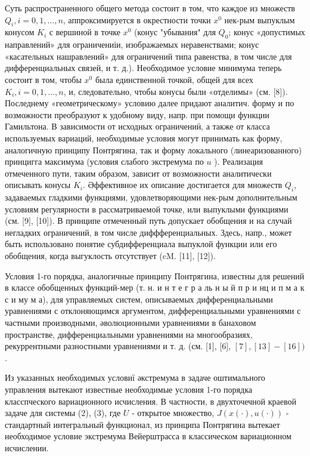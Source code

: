 \documentclass[10pt]{article}
\begin{document}
Суть распространенного общего метода состоит в том, что каждое из множеств $Q_{i}, i=0,1, \ldots, n$, аппроксимируется в окрестности точки $x^{0}$ нек-рым выпуклым конусом $K_{i}$ с вершиной в точке $x^{0}$ (конус "убывания" для $Q_{0}$; конус «допустимых направлений» для ограничениіи, изображаемых неравенствами; конус «касательных нашравлений» для ограничений типа равенства, в том числе для дифференциальных связей, и т. д.). Необходимое условие минимума теперь состоит в том, чтобы $x^{0}$ была единственной точкой, общей для всех $K_{i}, i=0,1, \ldots, n$, и, следовательно, чтобы конусы были «отделимы» (см. [8]). Последнему «геометрическому» условию далее придают аналитич. форму и по возможности преобразуют к удобному виду, напр. при помощи функции Гамильтона. В зависимости от исходных ограничениӥ, а также от класса используемых вариаций, необходимые условия могут принимать как форму, аналогичную принципу Понтрягина, так и форму локального (линеаризованного) принцигга максимума (условия слабого экстремума по $u$ ). Реализация отмеченного пути, таким образом, зависит от возможности аналитически описывать конусы $K_{i}$. Әффективное их описание достигается для множеств $Q_{i}$, задаваемых гладкими функциями, удовлетворяющими нек-рым дополнительным условиям регулярности в рассматриваемой точке, или выпуклыми функциями (см. [9], [10]). В принципе отмеченный путь допускает обобщения и на случай негладких ограничений, в том числе диффференциальных. Здесь, напр., может быть использовано понятие субдифференциала выпуклой функции или его обобщения, когда выгуклость отсутствует (cM. [11], [12]).



Условия 1-го порядка, аналогичные принципу Понтрягина, известны для решений в классе обобщенных функций-мер (т. н. и н т е г р а ль н ы й п р и нц и п м а к с и му м а), для управляемых систем, описываемых дифференциальными уравнениями с отклоняющимся аргументом, дифференциальными уравнениями с частными производными, әволюционными уравнениями в банаховом пространстве, дифференциальными уравнениями на многообразиях, рекуррентными разностными уравнениями и т. д. (см. [1], [6], $[7],[13]-[16])$.



Из указанных необходимых условиї әкстремума в задаче оштимального управления вытекают известные необходимые условия 1-го порядка класспческого вариационного исчисления. В частности, в двухточечной краевой задаче для системы (2), (3), где $U$ - открытое множество, $J(x(\cdot), u(\cdot))$ - стандартный интегральный функционал, из принципа Понтрягина вытекает необходимое условие экстремума Вейерштрасса в классическом вариационном исчислении.
\end{document}
